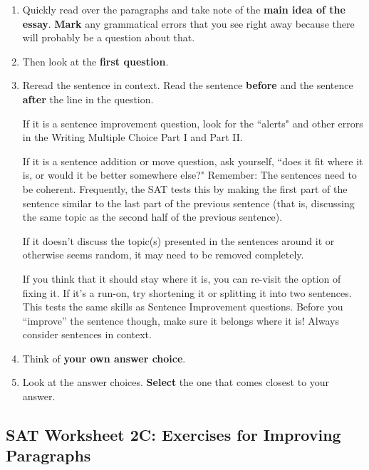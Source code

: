 \begin{enumerate}
\item Quickly read over the paragraphs and take note of the \textbf{main idea of the essay}. \textbf{Mark} any grammatical errors that you see right away because there will probably be a question about that.
\item Then look at the \textbf{first question}.  
\item Reread the sentence in context. Read the sentence \textbf{before} and the sentence \textbf{after} the line in the question. 

If it is a sentence improvement question, look for the ``alerts" and other errors in the Writing Multiple Choice Part I and Part II. 

If it is a sentence addition or move question, ask yourself, ``does it fit where it is, or would it be better somewhere else?" Remember: The sentences need to be coherent. Frequently, the SAT tests this by making the first part of the sentence similar to the last part of the previous sentence (that is, discussing the same topic as the second half of the previous sentence). 

If it doesn't discuss the topic(s) presented in the sentences around it or otherwise seems random, it may need to be removed completely. 

If you think that it should stay where it is, you can re-visit the option of fixing it.  If it's a run-on, try shortening it or splitting it into two sentences.  This tests the same skills as Sentence Improvement questions.  Before you “improve” the sentence though, make sure it belongs where it is!  Always consider sentences in context.

\item Think of \textbf{your own answer choice}.
\item Look at the answer choices.  \textbf{Select} the one that comes closest to your answer.
\end{enumerate}



\subsection{SAT Worksheet 2C: Exercises for Improving Paragraphs}


